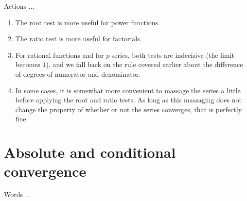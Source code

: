 \documentclass[10pt]{amsart}
\begin{document}
Actions ...

\begin{enumerate}
\item The root test is more useful for power functions.
\item The ratio test is more useful for factorials.
\item For rational functions and for $p$-series, both tests are
  indecisive (the limit becomes $1$), and we fall back on the rule
  covered earlier about the difference of degrees of numerator and
  denominator.
\item In some cases, it is somewhat more convenient to massage the
  series a little before applying the root and ratio tests. As long as
  this massaging does not change the property of whether or not the
  series converges, that is perfectly fine.
\end{enumerate}

\section{Absolute and conditional convergence}

Words ...
\end{document}
